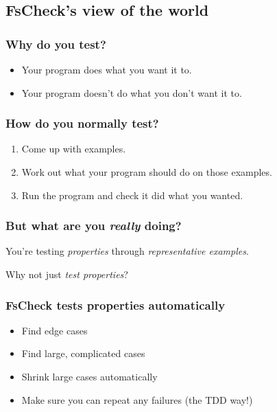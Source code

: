 \documentclass{beamer}
\begin{document}
\subsection{FsCheck's view of the world}

\begin{frame}
\tableofcontents[currentsection]
\end{frame}

\begin{frame}
\frametitle{Why do you test?}

\begin{itemize}
    \item Your program does what you want it to.
    \item Your program doesn't do what you don't want it to.
\end{itemize}
\end{frame}

\begin{frame}
\frametitle{How do you normally test?}

\begin{enumerate}
    \item Come up with examples.
    \item Work out what your program should do on those examples.
    \item Run the program and check it did what you wanted.
\end{enumerate}
\end{frame}

\begin{frame}
\frametitle{But what are you \emph{really} doing?}

You're testing \emph{properties} through \emph{representative examples}.
\end{frame}

\begin{frame}
    Why not just \emph{test properties}?
\end{frame}

\begin{frame}
\frametitle{FsCheck tests properties automatically}

\begin{itemize}
    \item Find edge cases
    \item Find large, complicated cases
    \item Shrink large cases automatically
    \item Make sure you can repeat any failures (the TDD way!)
\end{itemize}
\end{frame}
\end{document}
